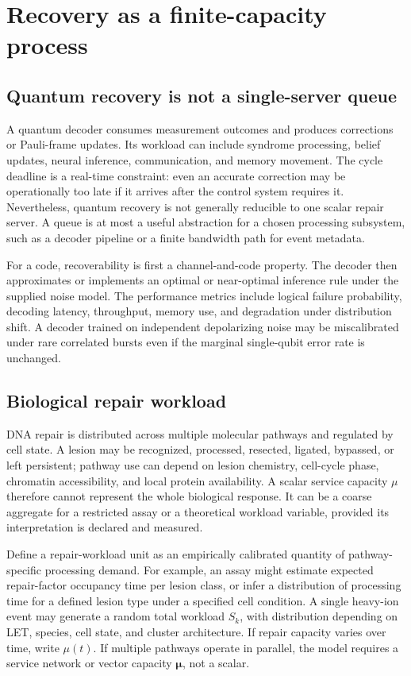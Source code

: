 \documentclass[11pt,a4paper,oneside]{article}
\begin{document}
\section{Recovery as a finite-capacity process}
\label{sec:recovery}
\subsection{Quantum recovery is not a single-server queue}
A quantum decoder consumes measurement outcomes and produces corrections or Pauli-frame updates. Its workload can include syndrome processing, belief updates, neural inference, communication, and memory movement. The cycle deadline is a real-time constraint: even an accurate correction may be operationally too late if it arrives after the control system requires it. Nevertheless, quantum recovery is not generally reducible to one scalar repair server. A queue is at most a useful abstraction for a chosen processing subsystem, such as a decoder pipeline or a finite bandwidth path for event metadata.

For a code, recoverability is first a channel-and-code property. The decoder then approximates or implements an optimal or near-optimal inference rule under the supplied noise model. The performance metrics include logical failure probability, decoding latency, throughput, memory use, and degradation under distribution shift. A decoder trained on independent depolarizing noise may be miscalibrated under rare correlated bursts even if the marginal single-qubit error rate is unchanged.

\subsection{Biological repair workload}
DNA repair is distributed across multiple molecular pathways and regulated by cell state. A lesion may be recognized, processed, resected, ligated, bypassed, or left persistent; pathway use can depend on lesion chemistry, cell-cycle phase, chromatin accessibility, and local protein availability. A scalar service capacity \(\mu\) therefore cannot represent the whole biological response. It can be a coarse aggregate for a restricted assay or a theoretical workload variable, provided its interpretation is declared and measured.

Define a repair-workload unit as an empirically calibrated quantity of pathway-specific processing demand. For example, an assay might estimate expected repair-factor occupancy time per lesion class, or infer a distribution of processing time for a defined lesion type under a specified cell condition. A single heavy-ion event may generate a random total workload \(S_k\), with distribution depending on LET, species, cell state, and cluster architecture. If repair capacity varies over time, write \(\mu(t)\). If multiple pathways operate in parallel, the model requires a service network or vector capacity \(\boldsymbol{\mu}\), not a scalar.
\end{document}
